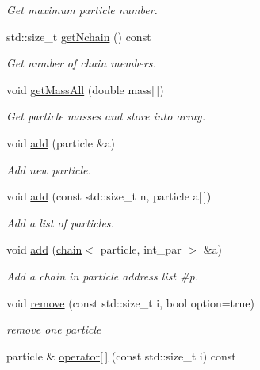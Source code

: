 \begin{DoxyCompactItemize}
\begin{DoxyCompactList}\small\item\em Get maximum particle number. \end{DoxyCompactList}\item 
std\+::size\+\_\+t \hyperlink{classARC_1_1chainlist_a1906d1caadfc424bbb6bd17a50affce9}{get\+Nchain} () const
\begin{DoxyCompactList}\small\item\em Get number of chain members. \end{DoxyCompactList}\item 
void \hyperlink{classARC_1_1chainlist_a5da7d970dfac2bb11f59d07c1d808f8e}{get\+Mass\+All} (double mass\mbox{[}$\,$\mbox{]})
\begin{DoxyCompactList}\small\item\em Get particle masses and store into array. \end{DoxyCompactList}\item 
void \hyperlink{classARC_1_1chainlist_ab04a5742cd27168e0404e57a67d6afd1}{add} (particle \&a)
\begin{DoxyCompactList}\small\item\em Add new particle. \end{DoxyCompactList}\item 
void \hyperlink{classARC_1_1chainlist_a4a9de54b724e9c911465a5e583dc9158}{add} (const std\+::size\+\_\+t n, particle a\mbox{[}$\,$\mbox{]})
\begin{DoxyCompactList}\small\item\em Add a list of particles. \end{DoxyCompactList}\item 
void \hyperlink{classARC_1_1chainlist_a0ffdf904f629c77ad75eb4f6f5116ab7}{add} (\hyperlink{classARC_1_1chain}{chain}$<$ particle, int\+\_\+par $>$ \&a)
\begin{DoxyCompactList}\small\item\em Add a chain in particle address list \#p. \end{DoxyCompactList}\item 
void \hyperlink{classARC_1_1chainlist_a16edd790019b6aa7a7f6b5cc3e59a2c3}{remove} (const std\+::size\+\_\+t i, bool option=true)
\begin{DoxyCompactList}\small\item\em remove one particle \end{DoxyCompactList}\item 
particle \& \hyperlink{classARC_1_1chainlist_a260bb9c07e8d25eff6e59997c1326daf}{operator\mbox{[}$\,$\mbox{]}} (const std\+::size\+\_\+t i) const

\end{DoxyCompactItemize}
